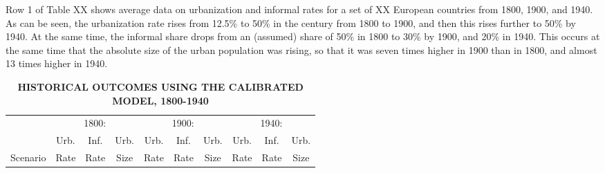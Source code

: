 \documentclass[10pt]{article}
\begin{document}
Row 1 of Table XX shows average data on urbanization and informal rates for a set of XX European countries from 1800, 1900, and 1940. As can be seen, the urbanization rate rises from 12.5\% to 50\% in the century from 1800 to 1900, and then this rises further to 50\% by 1940. At the same time, the informal share drops from an (assumed) share of 50\% in 1800 to 30\% by 1900, and 20\% in 1940. This occurs at the same time that the absolute size of the urban population was rising, so that it was seven times higher in 1900 than in 1800, and almost 13 times higher in 1940. 



\begin{table}[htb]
\begin{center}
\begin{footnotesize}
\caption{\textbf{HISTORICAL OUTCOMES USING THE CALIBRATED MODEL, 1800-1940}} \label{tab_longrun}
\begin{tabular}{lccccccccc}
\midrule
         & \multicolumn{3}{c}{1800:} & \multicolumn{3}{c}{1900:} & \multicolumn{3}{c}{1940:} \\ \cmidrule(lr){2-4} \cmidrule(lr){5-7} \cmidrule(lr){8-10}
         & Urb. & Inf. & Urb. & Urb. & Inf. & Urb. & Urb. & Inf. & Urb. \\
Scenario & Rate & Rate & Size & Rate & Rate & Size & Rate & Rate & Size  \\ \midrule

\midrule
\end{tabular}
\end{footnotesize}
\end{center}
\end{table}
\end{document}
